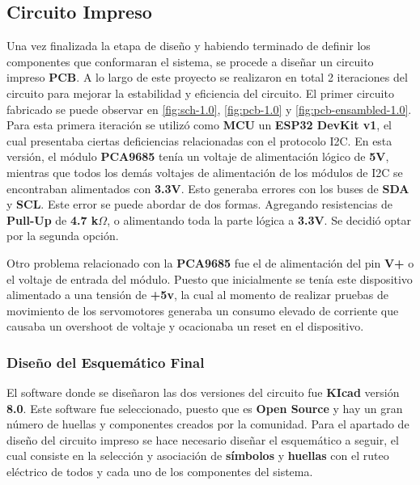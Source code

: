     \subsection{Circuito Impreso}

        Una vez finalizada la etapa de diseño y habiendo terminado de definir los componentes que conformaran el sistema, se procede a diseñar un circuito impreso \textbf{PCB}. A lo largo de este proyecto se realizaron en total 2 iteraciones del circuito para mejorar la estabilidad y eficiencia del circuito. El primer circuito fabricado se puede observar en \ref{fig:sch-1.0}, \ref{fig:pcb-1.0} y \ref{fig:pcb-ensambled-1.0}. Para esta primera iteración se utilizó como \textbf{MCU} un \textbf{ESP32 DevKit v1}, el cual presentaba ciertas deficiencias relacionadas con el protocolo I2C. En esta versión, el módulo \textbf{PCA9685} tenía un voltaje de alimentación lógico de \textbf{5V}, mientras que todos los demás voltajes de alimentación de los módulos de I2C se encontraban alimentados con \textbf{3.3V}. Esto generaba errores con los buses de \textbf{SDA} y \textbf{SCL}. Este error se puede abordar de dos formas. Agregando resistencias de \textbf{Pull-Up} de \textbf{4.7 k$\Omega$}, o alimentando toda la parte lógica a \textbf{3.3V}. Se decidió optar por la segunda opción. \vspace{5px}
            


        Otro problema relacionado con la \textbf{PCA9685} fue el de alimentación del pin \textbf{V+} o el voltaje de entrada del módulo. Puesto que inicialmente se tenía este dispositivo alimentado a una tensión de \textbf{+5v}, la cual al momento de realizar pruebas de movimiento de los servomotores generaba un consumo elevado de corriente que causaba un overshoot de voltaje y ocacionaba un reset en el dispositivo.\vspace{5px} 


        \subsubsection{ Diseño del Esquemático Final}

            \vspace{5px}
            El software donde se diseñaron las dos versiones del circuito fue \textbf{KIcad} versión \textbf{8.0}. Este software fue seleccionado, puesto que es \textbf{Open Source} y hay un gran número de huellas y componentes creados por la comunidad. Para el apartado de diseño del circuito impreso se hace necesario diseñar el esquemático a seguir, el cual consiste en la selección y asociación de \textbf{símbolos} y \textbf{huellas} con el ruteo eléctrico de todos y cada uno de los componentes del sistema. \vspace{5px}



